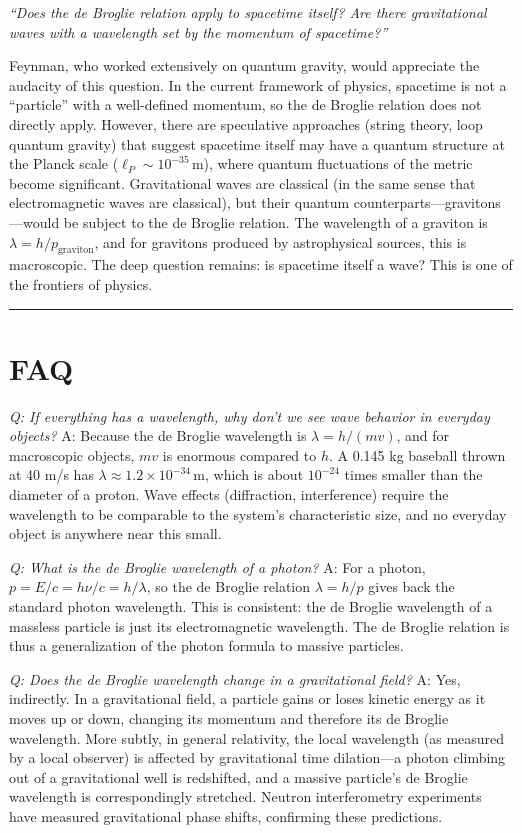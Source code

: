 \textit{``Does the de Broglie relation apply to spacetime itself? Are there gravitational waves with a wavelength set by the momentum of spacetime?''}

Feynman, who worked extensively on quantum gravity, would appreciate the audacity of this question. In the current framework of physics, spacetime is not a ``particle'' with a well-defined momentum, so the de Broglie relation does not directly apply. However, there are speculative approaches (string theory, loop quantum gravity) that suggest spacetime itself may have a quantum structure at the Planck scale ($\ell_P \sim 10^{-35}\,\text{m}$), where quantum fluctuations of the metric become significant. Gravitational waves are classical (in the same sense that electromagnetic waves are classical), but their quantum counterparts---gravitons---would be subject to the de Broglie relation. The wavelength of a graviton is $\lambda = h/p_{\text{graviton}}$, and for gravitons produced by astrophysical sources, this is macroscopic. The deep question remains: is spacetime itself a wave? This is one of the frontiers of physics.

\bigskip
\hrule
\bigskip
\section*{FAQ}

\textit{Q: If everything has a wavelength, why don't we see wave behavior in everyday objects?}
A: Because the de Broglie wavelength is $\lambda = h/(mv)$, and for macroscopic objects, $mv$ is enormous compared to $h$. A 0.145 kg baseball thrown at 40 m/s has $\lambda \approx 1.2\times 10^{-34}\,\text{m}$, which is about $10^{-24}$ times smaller than the diameter of a proton. Wave effects (diffraction, interference) require the wavelength to be comparable to the system's characteristic size, and no everyday object is anywhere near this small.

\textit{Q: What is the de Broglie wavelength of a photon?}
A: For a photon, $p = E/c = h\nu/c = h/\lambda$, so the de Broglie relation $\lambda = h/p$ gives back the standard photon wavelength. This is consistent: the de Broglie wavelength of a massless particle is just its electromagnetic wavelength. The de Broglie relation is thus a generalization of the photon formula to massive particles.

\textit{Q: Does the de Broglie wavelength change in a gravitational field?}
A: Yes, indirectly. In a gravitational field, a particle gains or loses kinetic energy as it moves up or down, changing its momentum and therefore its de Broglie wavelength. More subtly, in general relativity, the local wavelength (as measured by a local observer) is affected by gravitational time dilation---a photon climbing out of a gravitational well is redshifted, and a massive particle's de Broglie wavelength is correspondingly stretched. Neutron interferometry experiments have measured gravitational phase shifts, confirming these predictions.
